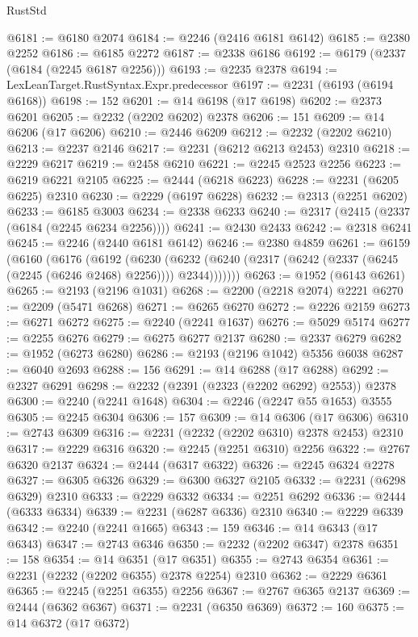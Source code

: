 \begin{lexlean}{RustStd}
\begin{coremodule}
@6181 := @6180 @2074
@6184 := @2246 (@2416 @6181 @6142)
@6185 := @2380 @2252
@6186 := @6185 @2272
@6187 := @2338 @6186
@6192 := @6179 (@2337 (@6184 (@2245 @6187 @2256)))
@6193 := @2235 @2378
@6194 := LexLeanTarget.RustSyntax.Expr.predecessor
@6197 := @2231 (@6193 (@6194 @6168))
@6198 := 152
@6201 := @14 @6198 (@17 @6198)
@6202 := @2373 @6201
@6205 := @2232 (@2202 @6202) @2378
@6206 := 151
@6209 := @14 @6206 (@17 @6206)
@6210 := @2446 @6209
@6212 := @2232 (@2202 @6210)
@6213 := @2237 @2146
@6217 := @2231 (@6212 @6213 @2453) @2310
@6218 := @2229 @6217
@6219 := @2458 @6210
@6221 := @2245 @2523 @2256
@6223 := @6219 @6221 @2105
@6225 := @2444 (@6218 @6223)
@6228 := @2231 (@6205 @6225) @2310
@6230 := @2229 (@6197 @6228)
@6232 := @2313 (@2251 @6202)
@6233 := @6185 @3003
@6234 := @2338 @6233
@6240 := @2317 (@2415 (@2337 (@6184 (@2245 @6234 @2256))))
@6241 := @2430 @2433
@6242 := @2318 @6241
@6245 := @2246 (@2440 @6181 @6142)
@6246 := @2380 @4859
@6261 := @6159
    (@6160
      (@6176
        (@6192
          (@6230
            (@6232 (@6240 (@2317 (@6242 (@2337 (@6245 (@2245 (@6246 @2468) @2256)))) @2344)))))))
@6263 := @1952 (@6143 @6261)
@6265 := @2193 (@2196 @1031)
@6268 := @2200 (@2218 @2074) @2221
@6270 := @2209 (@5471 @6268)
@6271 := @6265 @6270
@6272 := @2226 @2159
@6273 := @6271 @6272
@6275 := @2240 (@2241 @1637)
@6276 := @5029 @5174
@6277 := @2255 @6276
@6279 := @6275 @6277 @2137
@6280 := @2337 @6279
@6282 := @1952 (@6273 @6280)
@6286 := @2193 (@2196 @1042) @5356 @6038
@6287 := @6040 @2693
@6288 := 156
@6291 := @14 @6288 (@17 @6288)
@6292 := @2327 @6291
@6298 := @2232 (@2391 (@2323 (@2202 @6292) @2553)) @2378
@6300 := @2240 (@2241 @1648)
@6304 := @2246 (@2247 @55 @1653) @3555
@6305 := @2245 @6304
@6306 := 157
@6309 := @14 @6306 (@17 @6306)
@6310 := @2743 @6309
@6316 := @2231 (@2232 (@2202 @6310) @2378 @2453) @2310
@6317 := @2229 @6316
@6320 := @2245 (@2251 @6310) @2256
@6322 := @2767 @6320 @2137
@6324 := @2444 (@6317 @6322)
@6326 := @2245 @6324 @2278
@6327 := @6305 @6326
@6329 := @6300 @6327 @2105
@6332 := @2231 (@6298 @6329) @2310
@6333 := @2229 @6332
@6334 := @2251 @6292
@6336 := @2444 (@6333 @6334)
@6339 := @2231 (@6287 @6336) @2310
@6340 := @2229 @6339
@6342 := @2240 (@2241 @1665)
@6343 := 159
@6346 := @14 @6343 (@17 @6343)
@6347 := @2743 @6346
@6350 := @2232 (@2202 @6347) @2378
@6351 := 158
@6354 := @14 @6351 (@17 @6351)
@6355 := @2743 @6354
@6361 := @2231 (@2232 (@2202 @6355) @2378 @2254) @2310
@6362 := @2229 @6361
@6365 := @2245 (@2251 @6355) @2256
@6367 := @2767 @6365 @2137
@6369 := @2444 (@6362 @6367)
@6371 := @2231 (@6350 @6369)
@6372 := 160
@6375 := @14 @6372 (@17 @6372)

\end{coremodule}
\end{lexlean}
